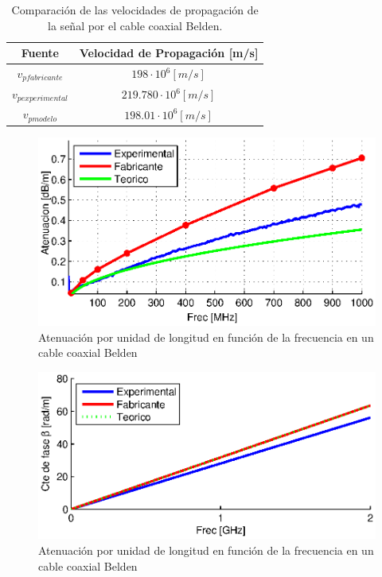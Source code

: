 \documentclass[10pt,conference,a4paper]{IEEEtran}
\begin{document}
\begin{table}[htb]
    \renewcommand{\arraystretch}{1.2}
    \centering
    \begin{tabular}{|c|c|}
	\hline
	Fuente & Velocidad de Propagación [m/s] \\
	\hline
	$v_{p fabricante}$ & $198 \cdot 10^6 [m/s]$ \\
	$v_{p experimental }$ & $219.780 \cdot 10^6 [m/s]$ \\
	$v_{p modelo}$ & $198.01 \cdot 10^6 [m/s]$ \\
	\hline
    \end{tabular}
    \caption{Comparación de las velocidades de propagación de la señal por el cable coaxial Belden.}
    \label{tab:vp_coaxial}
\end{table}

\begin{figure}[htb]
    \centering
    \includegraphics[width=\columnwidth]{figuras/atenuacion_comparada.eps}
    \caption{Atenuación por unidad de longitud en función de la frecuencia en un cable coaxial Belden}
    \label{fig:atenuacion_comparada_coaxial}
\end{figure}
\begin{figure}[htb]
    \centering
    \includegraphics[width=\columnwidth]{figuras/constante_fase.eps}
    \caption{Atenuación por unidad de longitud en función de la frecuencia en un cable coaxial Belden}
    \label{fig:constante_fase}
\end{figure}
\end{document}

